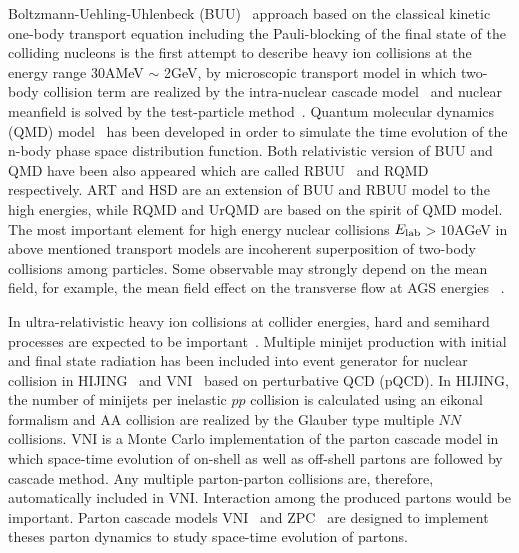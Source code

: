 \documentclass[]{article}
\newcommand{\Elab}{\mbox{$E_{\rm lab}$}}
\begin{document}
Boltzmann-Uehling-Uhlenbeck (BUU)~\cite{buu} approach
  based on the classical kinetic one-body transport equation
  including the Pauli-blocking of the final state of the colliding nucleons
  is the first attempt to describe heavy ion collisions
  at the energy range 30AMeV $\sim$ 2GeV,
  by microscopic transport model
  in which two-body collision term are realized
  by the intra-nuclear cascade model~\cite{inc1,inc2,inc3}
  and nuclear meanfield is solved by the test-particle method~\cite{buu}.
Quantum molecular dynamics (QMD) model~\cite{qmd}
  has been developed in order to simulate the time evolution of the
  n-body phase space distribution function.
Both relativistic version of BUU and QMD have been also
  appeared which are called RBUU~\cite{rbuu} and RQMD~\cite{rqmd1} respectively.
ART and HSD are an extension of BUU and RBUU model to the high energies,
  while RQMD and UrQMD are based on the spirit of QMD model.
The most important element for high energy nuclear collisions \Elab$>10$AGeV
  in above mentioned transport models are incoherent superposition of
  two-body collisions among particles.
Some observable may strongly depend on the mean field,
  for example, the mean field effect on the transverse flow at AGS energies
  ~\cite{flow,art}.



In ultra-relativistic heavy ion collisions at collider energies,
 hard and semihard processes are expected to be important~\cite{hijing}.
Multiple minijet production with initial and final state radiation
  has been included into event generator for nuclear collision
  in HIJING~\cite{hijing} and VNI~\cite{vni} based on perturbative QCD (pQCD).
In HIJING, the number of minijets per inelastic $pp$ collision
  is calculated using an eikonal formalism and AA collision
  are realized by the Glauber type multiple $NN$ collisions.
VNI is a Monte Carlo implementation of the parton cascade model
  in which space-time evolution of on-shell as well as off-shell partons
  are followed by cascade method.
Any multiple parton-parton collisions are, therefore,
  automatically included in VNI.
Interaction among the produced partons would be important.
Parton cascade models VNI~\cite{vni} and ZPC~\cite{zpc}
 are designed to implement theses parton dynamics to study
 space-time evolution of partons.
\end{document}
